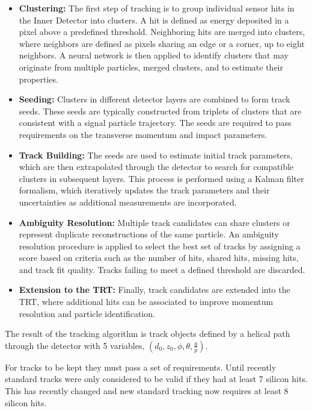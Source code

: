 \begin{itemize}
  \item \textbf{Clustering:} The first step of tracking is to group individual sensor hits in the Inner Detector into clusters. A hit is defined as energy deposited in a pixel above a predefined threshold. Neighboring hits are merged into clusters, where neighbors are defined as pixels sharing an edge or a corner, up to eight neighbors. A neural network is then applied to identify clusters that may originate from multiple particles, merged clusters, and to estimate their properties.

  \item \textbf{Seeding:} Clusters in different detector layers are combined to form track seeds. These seeds are typically constructed from triplets of clusters that are consistent with a signal particle trajectory. The seeds are required to pass requirements on the transverse momentum and impact parameters. 

  \item \textbf{Track Building:} The seeds are used to estimate initial track parameters, which are then extrapolated through the detector to search for compatible clusters in subsequent layers. This process is performed using a Kalman filter formalism, which iteratively updates the track parameters and their uncertainties as additional measurements are incorporated.

  \item \textbf{Ambiguity Resolution:} Multiple track candidates can share clusters or represent duplicate reconstructions of the same particle. An ambiguity resolution procedure is applied to select the best set of tracks by assigning a score based on criteria such as the number of hits, shared hits, missing hits, and track fit quality. Tracks failing to meet a defined threshold are discarded.

  \item \textbf{Extension to the TRT:} Finally, track candidates are extended into the TRT, where additional hits can be associated to improve momentum resolution and particle identification.
\end{itemize}

The result of the tracking algorithm is track objects defined by a helical path through the detector with 5 variables, $(d_0, z_0, \phi, \theta, \frac{q}{p})$.

For tracks to be kept they must pass a set of requirements. Until recently standard tracks were only considered to be valid if they had at least 7 silicon hits. This has recently changed and new standard tracking now requires at least 8 silicon hits. 

